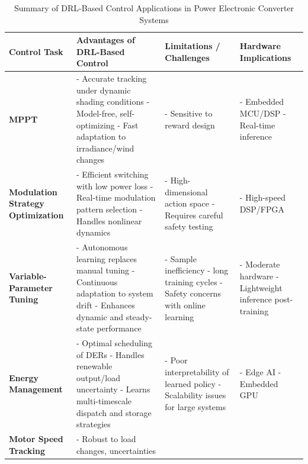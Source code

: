\begin{table}[t] 
\centering
\caption{Summary of DRL-Based Control Applications in Power Electronic Converter Systems}
\label{tab:DRL_ControlSummary}
\renewcommand{\arraystretch}{1.3}
\setlength{\tabcolsep}{6pt}
\begin{tabular}{|p{2.5cm}|p{6.5cm}|p{4.5cm}|p{3.5cm}|}
\hline
\textbf{Control Task} & \textbf{Advantages of DRL-Based Control} & \textbf{Limitations / Challenges} & \textbf{Hardware Implications} \\
\hline
\textbf{MPPT} & 
- Accurate tracking under dynamic shading conditions \newline
- Model-free, self-optimizing \newline
- Fast adaptation to irradiance/wind changes & 
- Sensitive to reward design & 
- Embedded MCU/DSP \newline
- Real-time inference \\
\hline
\textbf{Modulation Strategy Optimization} & 
- Efficient switching with low power loss \newline
- Real-time modulation pattern selection \newline
- Handles nonlinear dynamics & 
- High-dimensional action space \newline
- Requires careful safety testing & 
- High-speed DSP/FPGA \\
\hline
\textbf{Variable-Parameter Tuning} & 
- Autonomous learning replaces manual tuning \newline
- Continuous adaptation to system drift \newline
- Enhances dynamic and steady-state performance & 
- Sample inefficiency \newline
- long training cycles \newline
- Safety concerns with online learning & 
- Moderate hardware  \newline
- Lightweight inference post-training \\
\hline
\textbf{Energy Management} & 
- Optimal scheduling of DERs \newline
- Handles renewable output/load uncertainty \newline
- Learns multi-timescale dispatch and storage strategies & 
- Poor interpretability of learned policy \newline
- Scalability issues for large systems & 
- Edge AI \newline
- Embedded GPU \\
\hline
\textbf{Motor Speed Tracking} & 
- Robust to load changes, uncertainties \newline

\end{tabular}
\end{table}
